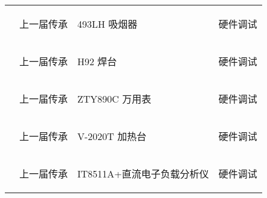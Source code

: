 \begin{longtable}{ X | X | X | X }
    \cline{2-4}

         &
        \begin{center}
            上一届传承
        \end{center}&
        \begin{center}
            493LH 吸烟器
        \end{center}&
        \begin{center}
            硬件调试
        \end{center}\\

    \cline{2-4}

         &
        \begin{center}
            上一届传承
        \end{center}&
        \begin{center}
            H92 焊台
        \end{center}&
        \begin{center}
            硬件调试
        \end{center}\\

    \cline{2-4}

         &
        \begin{center}
            上一届传承
        \end{center}&
        \begin{center}
            ZTY890C 万用表
        \end{center}&
        \begin{center}
            硬件调试
        \end{center}\\

    \cline{2-4}

         &
        \begin{center}
            上一届传承
        \end{center}&
        \begin{center}
            V-2020T 加热台
        \end{center}&
        \begin{center}
            硬件调试
        \end{center}\\

    \cline{2-4}

     &
        \begin{center}
            上一届传承
        \end{center}&
        \begin{center}
            IT8511A+直流电子负载分析仪
        \end{center}&
        \begin{center}
            硬件调试
        \end{center}\\


\end{longtable}
